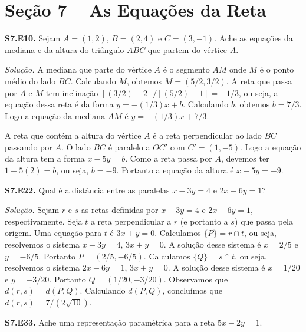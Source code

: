 \documentclass[a4paper,11pt]{article}
\begin{document}
\section*{Seção 7 -- As Equações da Reta}

\textbf{S7.E10.}
Sejam $A = (1,2)$, $B = (2,4)$ e $C = (3,-1)$.
Ache as equações da mediana e da altura do triângulo $ABC$ que partem do vértice $A$.

\vspace{\baselineskip}

\emph{Solução.}
A mediana que parte do vértice $A$ é o segmento $AM$ onde $M$ é o ponto médio do lado $BC$.
Calculando $M$, obtemos $M = (5/2,3/2)$.
A reta que passa por $A$ e $M$ tem inclinação $[(3/2)-2]/[(5/2)-1] = -1/3$, ou seja, a equação dessa reta é da forma $y = -(1/3)x + b$.
Calculando $b$, obtemos $b = 7/3$.
Logo a equação da mediana $AM$ é $y = -(1/3)x + 7/3$.

A reta que contém a altura do vértice $A$ é a reta perpendicular ao lado $BC$ passando por $A$.
O lado $BC$ é paralelo a $OC'$ com $C' = (1,-5)$.
Logo a equação da altura tem a forma $x - 5y = b$.
Como a reta passa por $A$, devemos ter $1-5(2) = b$, ou seja, $b = -9$.
Portanto a equação da altura é $x - 5y = -9$.

\vspace{\baselineskip}

\textbf{S7.E22.}
Qual é a distância entre as paralelas $x - 3y = 4$ e $2x - 6y = 1$?

\vspace{\baselineskip}

\emph{Solução.}
Sejam $r$ e $s$ as retas definidas por $x - 3y = 4$ e $2x - 6y = 1$, respectivamente.
Seja $t$ a reta perpendicular a $r$ (e portanto a $s$) que passa pela origem.
Uma equação para $t$ é $3x + y = 0$.
Calculamos $\{P\} = r \cap t$, ou seja, resolvemos o sistema $x-3y = 4$, $3x + y = 0$.
A solução desse sistema é $x = 2/5$ e $y = -6/5$.
Portanto $P = (2/5, -6/5)$.
Calculamos $\{Q\} = s \cap t$, ou seja, resolvemos o sistema $2x - 6y = 1$, $3x + y = 0$.
A solução desse sistema é $x = 1/20$ e $y = -3/20$.
Portanto $Q = (1/20, -3/20)$.
Observamos que $d(r,s) = d(P,Q)$.
Calculando $d(P,Q)$, concluímos que
$d(r,s) = 7/(2 \sqrt{10})$.

\vspace{\baselineskip}

\textbf{S7.E33.}
Ache uma representação paramétrica para a reta $5x - 2y = 1$.

\vspace{\baselineskip}
\end{document}
